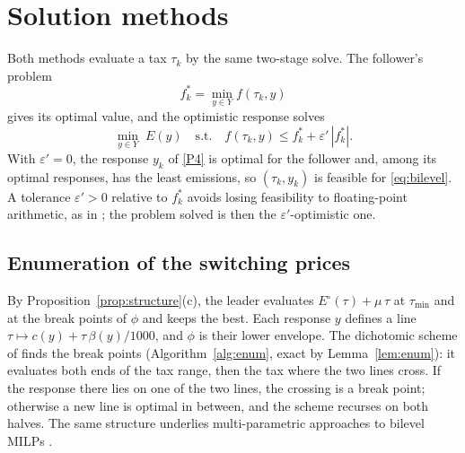 \documentclass[review,11pt,nonatbib]{elsarticle}
\theoremstyle{remark}
\newcommand{\tmin}{\tau_{\min}}
\begin{document}
\section{Solution methods}\label{sec:methods}

Both methods evaluate a tax $\tau_k$ by the same two-stage solve. The follower's problem
\begin{equation}
f^*_k = \min_{y \in Y} f(\tau_k, y) \tag{P3}\label{P3}
\end{equation}
gives its optimal value, and the optimistic response solves
\begin{equation}
\min_{y \in Y} \; E(y) \quad \text{s.t.} \quad f(\tau_k, y) \le f^*_k + \varepsilon' \, |f^*_k|. \tag{P4}\label{P4}
\end{equation}
With $\varepsilon' = 0$, the response $y_k$ of \eqref{P4} is optimal for the follower and, among its optimal responses, has the least emissions, so $(\tau_k, y_k)$ is feasible for \eqref{eq:bilevel}. A tolerance $\varepsilon' > 0$ relative to $f^*_k$ avoids losing feasibility to floating-point arithmetic, as in \textcite{soares2021deterministic}; the problem solved is then the $\varepsilon'$-optimistic one.

\subsection{Enumeration of the switching prices}\label{sec:enumeration}

By Proposition~\ref{prop:structure}(c), the leader evaluates $E^\circ(\tau) + \mu\,\tau$ at $\tmin$ and at the break points of $\phi$ and keeps the best. Each response $y$ defines a line $\tau \mapsto c(y) + \tau\,\beta(y)/1000$, and $\phi$ is their lower envelope. The dichotomic scheme of \textcite{aneja1979bicriteria} finds the break points (Algorithm~\ref{alg:enum}, exact by Lemma~\ref{lem:enum}): it evaluates both ends of the tax range, then the tax where the two lines cross. If the response there lies on one of the two lines, the crossing is a break point; otherwise a new line is optimal in between, and the scheme recurses on both halves. The same structure underlies multi-parametric approaches to bilevel MILPs \parencite{avraamidou2019multi}.
\end{document}
